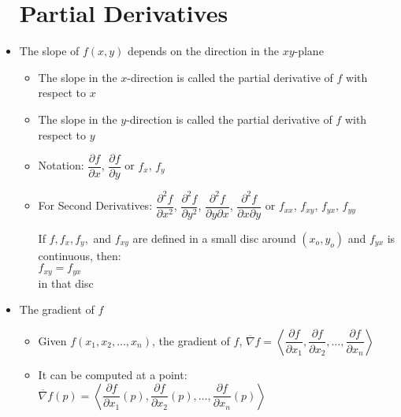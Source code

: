 \begin{itemize}

    \section{Partial Derivatives}

  \item The slope of $f(x,y)$ depends on the direction in the $xy$-plane

    \begin{itemize}

      \item The slope in the $x$-direction is called the partial derivative of $f$ with respect to $x$

      \item The slope in the $y$-direction is called the partial derivative of $f$ with respect to $y$

      \item Notation: $\dfrac{\partial f}{\partial x}$, $\dfrac{\partial f}{\partial y}$ or $f_x$, $f_y$

      \item For Second Derivatives: $\dfrac{\partial^2 f}{\partial x^2}$, $\dfrac{\partial^2 f}{\partial y^2}$, $\dfrac{\partial^2 f}{\partial y \partial x}$, $\dfrac{\partial^2 f}{\partial x \partial y}$ or $f_{xx}$, $f_{xy}$, $f_{yx}$, $f_{yy}$

        \vspace{10pt}

        \begin{center}
        If $f,f_x,f_y,$ and $f_{xy}$ are defined in a small disc around $(x_o,y_o)$ and $f_{yx}$ is continuous, then:\\ $f_{xy}=f_{yx}$\\in that disc
        \end{center}

    \end{itemize}

  \item The gradient of $f$

    \begin{itemize}

      \item Given $f(x_1,x_2,\dots,x_n)$, the gradient of $f$, $\overline{\nabla} f=\left\langle \dfrac{\partial f}{\partial x_1}, \dfrac{\partial f}{\partial x_2}, \dots, \dfrac{\partial f}{\partial x_n} \right\rangle$

      \item It can be computed at a point: $\overline{\nabla} f(p)=\left\langle \dfrac{\partial f}{\partial x_1}(p), \dfrac{\partial f}{\partial x_2}(p), \dots, \dfrac{\partial f}{\partial x_n}(p) \right\rangle$


\end{itemize}
\end{itemize}
